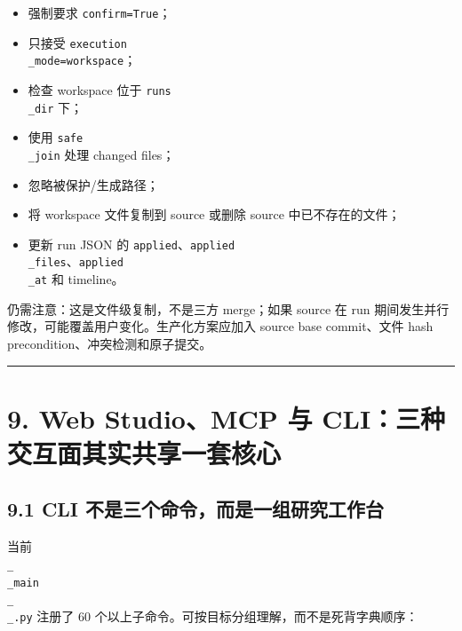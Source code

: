 \documentclass[UTF8,12pt,openany]{ctexbook}
\begin{document}
\begin{itemize}
\item 强制要求 \texttt{confirm=True}；
\item 只接受 \texttt{execution\\_mode=workspace}；
\item 检查 workspace 位于 \texttt{runs\\_dir} 下；
\item 使用 \texttt{safe\\_join} 处理 changed files；
\item 忽略被保护/生成路径；
\item 将 workspace 文件复制到 source 或删除 source 中已不存在的文件；
\item 更新 run JSON 的 \texttt{applied}、\texttt{applied\\_files}、\texttt{applied\\_at} 和 timeline。
\end{itemize}

仍需注意：这是文件级复制，不是三方 merge；如果 source 在 run 期间发生并行修改，可能覆盖用户变化。生产化方案应加入 source base commit、文件 hash precondition、冲突检测和原子提交。\par

\hrule

\section{9. Web Studio、MCP 与 CLI：三种交互面其实共享一套核心}

\subsection{9.1 CLI 不是三个命令，而是一组研究工作台}

当前 \texttt{\\_\\_main\\_\\_.py} 注册了 60 个以上子命令。可按目标分组理解，而不是死背字典顺序：\par
\end{document}
